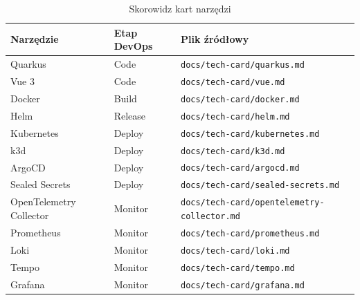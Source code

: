 \begin{table}[H]
  \centering
  \renewcommand{\thetable}{\arabic{table}}%
  \caption{Skorowidz kart narzędzi}
  \label{tab:tech-cards}
  \begin{tabular}{lll}
    \hline
    \textbf{Narzędzie} & \textbf{Etap DevOps} & \textbf{Plik źródłowy} \\
    \hline
    Quarkus                  & Code    & \texttt{docs/tech-card/quarkus.md} \\
    Vue 3                    & Code    & \texttt{docs/tech-card/vue.md} \\
    Docker                   & Build   & \texttt{docs/tech-card/docker.md} \\
    Helm                     & Release & \texttt{docs/tech-card/helm.md} \\
    Kubernetes               & Deploy  & \texttt{docs/tech-card/kubernetes.md} \\
    k3d                      & Deploy  & \texttt{docs/tech-card/k3d.md} \\
    ArgoCD                   & Deploy  & \texttt{docs/tech-card/argocd.md} \\
    Sealed Secrets           & Deploy  & \texttt{docs/tech-card/sealed-secrets.md} \\
    OpenTelemetry Collector  & Monitor & \texttt{docs/tech-card/opentelemetry-collector.md} \\
    Prometheus               & Monitor & \texttt{docs/tech-card/prometheus.md} \\
    Loki                     & Monitor & \texttt{docs/tech-card/loki.md} \\
    Tempo                    & Monitor & \texttt{docs/tech-card/tempo.md} \\
    Grafana                  & Monitor & \texttt{docs/tech-card/grafana.md} \\
    \hline
  \end{tabular}
\end{table}
